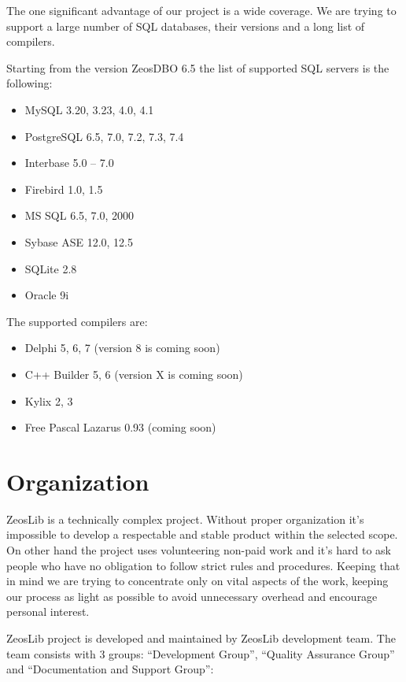 \documentclass[a4paper,12pt,oneside]{book}
\begin{document}
The one significant advantage of our project is a wide coverage.
We are trying to support a large number of SQL databases, their versions and a long list of compilers.

Starting from the version ZeosDBO 6.5 the list of supported SQL servers is the following:
\begin{itemize}
  \item MySQL 3.20, 3.23, 4.0, 4.1
	\item PostgreSQL 6.5, 7.0, 7.2, 7.3, 7.4
	\item Interbase 5.0 – 7.0
	\item Firebird 1.0, 1.5
	\item MS SQL 6.5, 7.0, 2000
	\item Sybase ASE 12.0, 12.5
	\item SQLite 2.8
	\item Oracle 9i
\end{itemize}

The supported compilers are:
\begin{itemize}
  \item Delphi 5, 6, 7 (version 8 is coming soon)
	\item C++ Builder 5, 6 (version X is coming soon)
	\item Kylix 2, 3
	\item Free Pascal Lazarus 0.93 (coming soon)
\end{itemize}

\section{Organization}
ZeosLib is a technically complex project.
Without proper organization it’s impossible to develop a respectable and stable product within the selected scope.
On other hand the project uses volunteering non-paid work and it’s hard to ask people who have no obligation to follow strict rules and procedures.
Keeping that in mind we are trying to concentrate only on vital aspects of the work, keeping our process as light as possible to avoid unnecessary overhead and encourage personal interest. 

ZeosLib project is developed and maintained by ZeosLib development team.
The team consists with 3 groups: “Development Group”, “Quality Assurance Group” and “Documentation and Support Group”:
\end{document}

